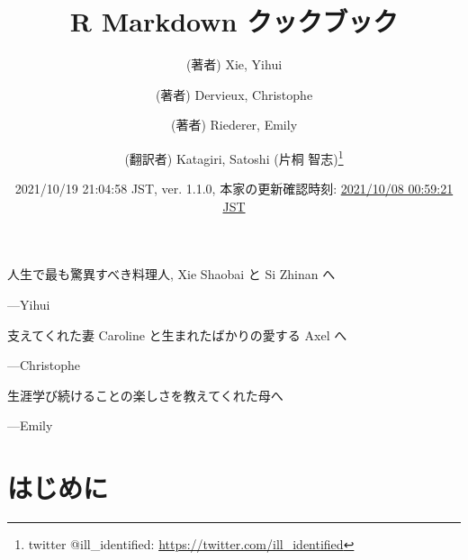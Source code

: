\documentclass[
  11pt,
  lualatex,ja=standard,jafont=noto]{bxjsreport}
\title{R Markdown クックブック}
\author{(著者) Xie, Yihui \and (著者) Dervieux, Christophe \and (著者) Riederer, Emily \and (翻訳者) Katagiri, Satoshi (片桐 智志)\footnote{twitter @ill\_identified: \url{https://twitter.com/ill_identified}}}
\date{2021/10/19 21:04:58 JST, ver. 1.1.0, 本家の更新確認時刻: \href{https://github.com/yihui/rmarkdown-cookbook}{2021/10/08 00:59:21 JST}}
\begin{document}
\maketitle

\cleardoublepage\newpage\thispagestyle{empty}\null
\cleardoublepage\newpage\thispagestyle{empty}\null
\thispagestyle{empty}
\begin{large}
人生で最も驚異すべき料理人, Xie Shaobai と Si Zhinan へ
\begin{flushright}
---Yihui
\end{flushright}

\bigskip

支えてくれた妻 Caroline と生まれたばかりの愛する Axel へ
\begin{flushright}
---Christophe
\end{flushright}

\bigskip

生涯学び続けることの楽しさを教えてくれた母へ
\begin{flushright}
---Emily
\end{flushright}
\end{large}

\setlength{\abovedisplayskip}{-5pt}
\setlength{\abovedisplayshortskip}{-5pt}

{
\hypersetup{linkcolor=}
\setcounter{tocdepth}{2}
\tableofcontents
}
\listoftables
\listoffigures
\hypertarget{ux306fux3058ux3081ux306b}{%
\chapter*{はじめに}\label{ux306fux3058ux3081ux306b}}
\end{document}
